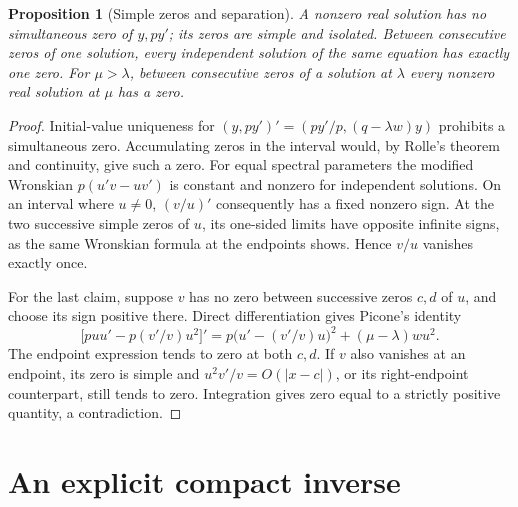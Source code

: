 \documentclass[11pt,oneside]{book}
\newtheorem{proposition}[theorem]{Proposition}
\theoremstyle{definition}
\theoremstyle{remark}\newtheorem{remark}[theorem]{Remark}
\begin{document}
\begin{proposition}[Simple zeros and separation]\label{d13:10:separation}
A nonzero real solution has no simultaneous zero of \(y,py'\); its zeros
are simple and isolated. Between consecutive zeros of one solution, every
independent solution of the same equation has exactly one zero.
For \(\mu>\lambda\), between consecutive zeros of a solution at \(\lambda\)
every nonzero real solution at \(\mu\) has a zero.
\end{proposition}
\begin{proof}
Initial-value uniqueness for \((y,py')'=(py'/p,(q-\lambda w)y)\)
prohibits a simultaneous zero. Accumulating zeros in the interval would,
by Rolle's theorem and continuity, give such a zero.
For equal spectral parameters the modified Wronskian
\(p(u'v-uv')\) is constant and nonzero for independent solutions.
On an interval where \(u\ne0\), \((v/u)'\) consequently has a fixed
nonzero sign. At the two successive simple zeros of \(u\), its one-sided
limits have opposite infinite signs, as the same Wronskian formula at
the endpoints shows. Hence \(v/u\) vanishes exactly once.

For the last claim, suppose \(v\) has no zero between successive zeros
\(c,d\) of \(u\), and choose its sign positive there. Direct differentiation
gives Picone's identity
\[
 \big[puu'-p(v'/v)u^2\big]'
 =p\big(u'-(v'/v)u\big)^2+(\mu-\lambda)wu^2 .
\]
The endpoint expression tends to zero at both \(c,d\).
If \(v\) also vanishes at an endpoint, its zero is simple and
\(u^2v'/v=O(|x-c|)\), or its right-endpoint counterpart, still tends to
zero. Integration gives zero equal to a strictly positive quantity,
a contradiction.
\end{proof}

\section{An explicit compact inverse}
\end{document}
